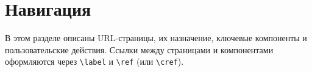 \chapter{Навигация}
\label{ch:navigation}

В этом разделе описаны URL-страницы, их назначение, ключевые компоненты и пользовательские действия.
Ссылки между страницами и компонентами оформляются через \texttt{\textbackslash label} и \texttt{\textbackslash ref} (или \texttt{\textbackslash cref}). 

%












% 
% 
% 
